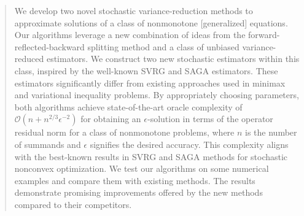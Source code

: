 \documentclass{article}
\theoremstyle{plain}
\theoremstyle{definition}
\theoremstyle{remark}
\begin{document}
\printAffiliationsAndNotice{}  %

\begin{abstract}
We develop two novel stochastic variance-reduction methods to approximate solutions of a class of nonmonotone [generalized] equations.
Our algorithms leverage a new combination of ideas from the forward-reflected-backward splitting method and  a class of unbiased variance-reduced estimators. 
We construct two new stochastic estimators within this class, inspired by the well-known SVRG and SAGA estimators. 
These estimators significantly differ from existing approaches used in minimax and variational inequality problems.
By appropriately choosing parameters, both algorithms achieve state-of-the-art oracle complexity of $\mathcal{O}(n + n^{2/3} \epsilon^{-2})$ for obtaining an $\epsilon$-solution in terms of the operator residual norm for a class of nonmonotone problems, where $n$ is the number of  summands and $\epsilon$ signifies the desired accuracy. 
This complexity aligns with the best-known results in SVRG and SAGA methods for stochastic nonconvex optimization. 
We test our algorithms on some numerical examples and compare them with existing methods.
The results demonstrate promising improvements offered by the new methods compared to their competitors.
\end{abstract}
\end{document}
